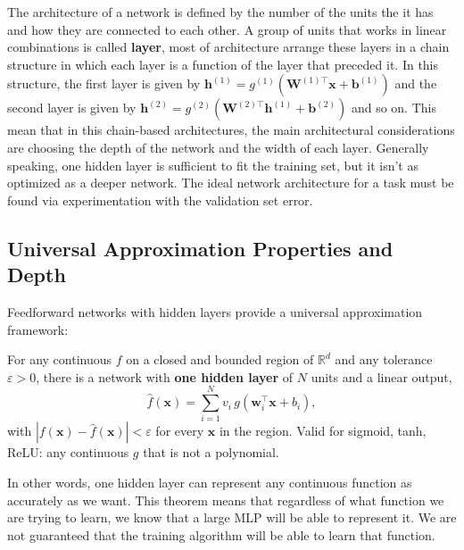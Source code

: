 The architecture of a network is defined by the number of the units the it has and how they are 
connected to each other. A group of units that works in linear combinations is called \textbf{layer}, 
most of architecture arrange these layers in a chain structure in which each layer is a function of the
layer that preceded it. 
\newline 
In this structure, the first layer is given by $\mathbf{h}^{(1)} = g^{(1)} \left( \mathbf{W}^{(1)\top}
\mathbf{x} + \mathbf{b}^{(1)} \right)$ and the second layer is given by $\mathbf{h}^{(2)} = g^{(2)} 
\left( \mathbf{W}^{(2)\top} \mathbf{h}^{(1)} + \mathbf{b}^{(2)} \right)$ and so on. This mean that in 
this chain-based architectures, the main architectural considerations are choosing the depth of the 
network and the width of each layer. Generally speaking, one hidden layer is sufficient to fit the
training set, but it isn't as optimized as a deeper network. The ideal network architecture for a task
must be found via experimentation with the validation set error.

\subsection{Universal Approximation Properties and Depth}
Feedforward networks with hidden layers provide a universal approximation framework:
\begin{theorem}
For any continuous $f$ on a closed and bounded region of $\mathbb{R}^d$ and any tolerance 
$\varepsilon > 0$, there is a network with \textbf{one hidden layer} of $N$ units and a linear output,
$$\hat{f}(\boldsymbol{x}) = \sum_{i=1}^{N} v_i \, g\left(\boldsymbol{w}_i^\top \boldsymbol{x} + 
b_i\right),$$ with $|f(\boldsymbol{x}) - \hat{f}(\boldsymbol{x})| < \varepsilon$ for every 
$\boldsymbol{x}$ in the region. Valid for sigmoid, tanh, ReLU: any continuous $g$ that is not a polynomial.
\end{theorem}
In other words, one hidden layer can represent any continuous function as accurately as we want.
\newline
This theorem means that regardless of what function we are trying to learn, we know that a large MLP 
will be able to represent it. We are not guaranteed that the training algorithm will be able to learn
that function.


